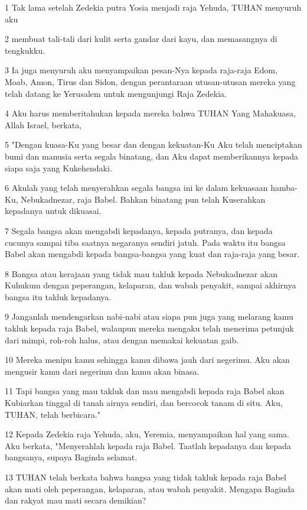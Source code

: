 \par 1 Tak lama setelah Zedekia putra Yosia menjadi raja Yehuda, TUHAN menyuruh aku
\par 2 membuat tali-tali dari kulit serta gandar dari kayu, dan memasangnya di tengkukku.
\par 3 Ia juga menyuruh aku menyampaikan pesan-Nya kepada raja-raja Edom, Moab, Amon, Tirus dan Sidon, dengan perantaraan utusan-utusan mereka yang telah datang ke Yerusalem untuk mengunjungi Raja Zedekia.
\par 4 Aku harus memberitahukan kepada mereka bahwa TUHAN Yang Mahakuasa, Allah Israel, berkata,
\par 5 "Dengan kuasa-Ku yang besar dan dengan kekuatan-Ku Aku telah menciptakan bumi dan manusia serta segala binatang, dan Aku dapat memberikannya kepada siapa saja yang Kukehendaki.
\par 6 Akulah yang telah menyerahkan segala bangsa ini ke dalam kekuasaan hamba-Ku, Nebukadnezar, raja Babel. Bahkan binatang pun telah Kuserahkan kepadanya untuk dikuasai.
\par 7 Segala bangsa akan mengabdi kepadanya, kepada putranya, dan kepada cucunya sampai tiba saatnya negaranya sendiri jatuh. Pada waktu itu bangsa Babel akan mengabdi kepada bangsa-bangsa yang kuat dan raja-raja yang besar.
\par 8 Bangsa atau kerajaan yang tidak mau takluk kepada Nebukadnezar akan Kuhukum dengan peperangan, kelaparan, dan wabah penyakit, sampai akhirnya bangsa itu takluk kepadanya.
\par 9 Janganlah mendengarkan nabi-nabi atau siapa pun juga yang melarang kamu takluk kepada raja Babel, walaupun mereka mengaku telah menerima petunjuk dari mimpi, roh-roh halus, atau dengan memakai kekuatan gaib.
\par 10 Mereka menipu kamu sehingga kamu dibawa jauh dari negerimu. Aku akan mengusir kamu dari negerimu dan kamu akan binasa.
\par 11 Tapi bangsa yang mau takluk dan mau mengabdi kepada raja Babel akan Kubiarkan tinggal di tanah airnya sendiri, dan bercocok tanam di situ. Aku, TUHAN, telah berbicara."
\par 12 Kepada Zedekia raja Yehuda, aku, Yeremia, menyampaikan hal yang sama. Aku berkata, "Menyerahlah kepada raja Babel. Taatlah kepadanya dan kepada bangsanya, supaya Baginda selamat.
\par 13 TUHAN telah berkata bahwa bangsa yang tidak takluk kepada raja Babel akan mati oleh peperangan, kelaparan, atau wabah penyakit. Mengapa Baginda dan rakyat mau mati secara demikian?
